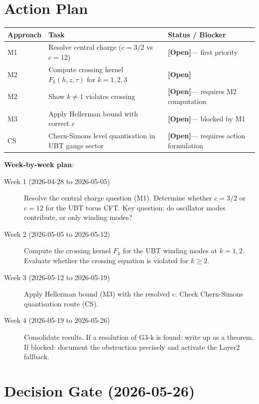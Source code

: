 \documentclass[12pt,a4paper]{article}
\theoremstyle{definition}
\theoremstyle{remark}
\newcommand{\OPEN}{\textbf{[Open]}}
\begin{document}
\section{Action Plan}
\label{sec:action}

\begin{center}
\begin{tabular}{lll}
\toprule
\textbf{Approach} & \textbf{Task} & \textbf{Status / Blocker} \\
\midrule
M1 & Resolve central charge ($c = 3/2$ vs $c = 12$) &
  \OPEN — first priority \\
M2 & Compute crossing kernel $F_k(h,z,\tau)$ for $k=1,2,3$ &
  \OPEN \\
M2 & Show $k \neq 1$ violates crossing &
  \OPEN — requires M2 computation \\
M3 & Apply Hellerman bound with correct $c$ &
  \OPEN — blocked by M1 \\
CS & Chern-Simons level quantisation in UBT gauge sector &
  \OPEN — requires action formulation \\
\bottomrule
\end{tabular}
\end{center}

\textbf{Week-by-week plan}:
\begin{description}
\item[Week 1 (2026-04-28 to 2026-05-05)] Resolve the central charge question (M1).
  Determine whether $c = 3/2$ or $c = 12$ for the UBT torus CFT.
  Key question: do oscillator modes contribute, or only winding modes?
\item[Week 2 (2026-05-05 to 2026-05-12)] Compute the crossing kernel $F_k$
  for the UBT winding modes at $k = 1, 2$.  Evaluate whether the crossing
  equation is violated for $k \geq 2$.
\item[Week 3 (2026-05-12 to 2026-05-19)] Apply Hellerman bound (M3) with the
  resolved $c$.  Check Chern-Simons quantisation route (CS).
\item[Week 4 (2026-05-19 to 2026-05-26)] Consolidate results.  If a resolution
  of G3-k is found: write up as a theorem.  If blocked: document the obstruction
  precisely and activate the Layer2 fallback.
\end{description}

\section{Decision Gate (2026-05-26)}
\label{sec:gate}
\end{document}
